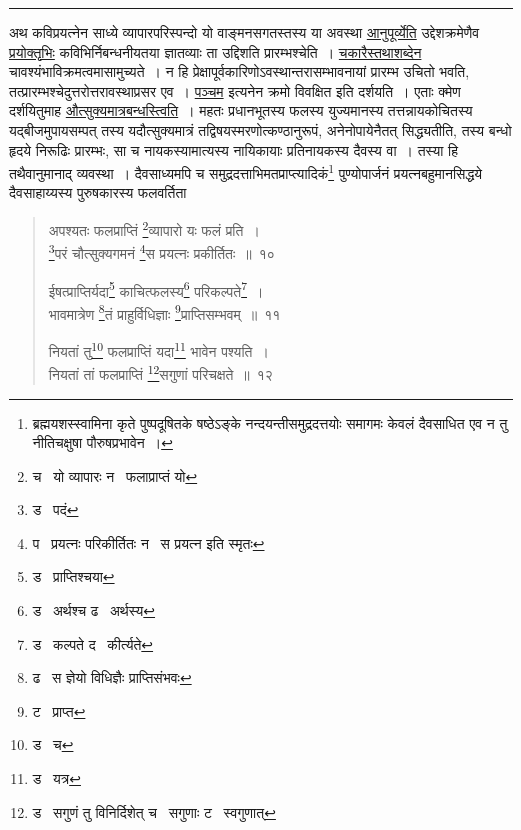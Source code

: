 \documentclass[11pt, openany]{book}
\begin{document}
\hrule

\vspace{2mm}
अथ कविप्रयत्नेन साध्ये व्यापारपरिस्पन्दो यो वाङ्मनसगतस्तस्य या अवस्था \underline{आनुपूर्व्येति} उद्देशक्रमेणैव \underline{प्रयोक्तृभिः} कविभिर्निबन्धनीयतया ज्ञातव्याः ता उद्दिशति प्रारम्भश्चेति~। \underline{चकारैस्तथाशब्देन} चावश्यंभाविक्रमत्वमासामुच्यते~। न हि प्रेक्षापूर्वकारिणोऽवस्थान्तरासम्भावनायां प्रारम्भ उचितो भवति, तत्प्रारम्भश्चेदुत्तरोत्तरावस्थाप्रसर एव~। \underline{पञ्चम} इत्यनेन क्रमो विवक्षित इति दर्शयति~। एताः क्मेण दर्शयितुमाह \underline{औत्सुक्यमात्रबन्धस्त्विति}~। महतः प्रधानभूतस्य फलस्य युज्यमानस्य तत्तन्नायकोचितस्य यद्बीजमुपायसम्पत् तस्य यदौत्सुक्यमात्रं तद्विषयस्मरणोत्कण्ठानुरूपं, अनेनोपायेनैतत् सिद्ध्यतीति, तस्य बन्धो हृदये निरूढिः प्रारम्भः, सा च नायकस्यामात्यस्य नायिकायाः प्रतिनायकस्य दैवस्य वा~। तस्या हि तथैवानुमानाद् व्यवस्था~। दैवसाध्यमपि च समुद्रदत्ताभिमतप्राप्त्यादिकं\renewcommand{\thefootnote}{*}\footnote{ब्रह्मयशस्स्वामिना कृते पुष्पदूषितके षष्ठेऽङ्के नन्दयन्तीसमुद्रदत्तयोः समागमः केवलं दैवसाधित एव न तु नीतिचक्षुषा पौरुषप्रभावेन~।} पुण्योपार्जनं प्रयत्नबहुमानसिद्धये दैवसाहाय्यस्य पुरुषकारस्य फलवर्तिता

\newpage

\begin{quote}
{\na अपश्यतः फलप्राप्तिं \renewcommand{\thefootnote}{1}\footnote{च \textendash\ यो व्यापारः न \textendash\ फलाप्राप्तं यो}व्यापारो यः फलं प्रति~।\\
\renewcommand{\thefootnote}{2}\footnote{ड \textendash\ पदं}परं चौत्सुक्यगमनं \renewcommand{\thefootnote}{3}\footnote{प \textendash\ प्रयत्नः परिकीर्तितः न \textendash\ स प्रयत्न इति स्मृतः}स प्रयत्नः प्रकीर्तितः~॥~१०

ईषत्प्राप्तिर्यदा\renewcommand{\thefootnote}{4}\footnote{ड \textendash\ प्राप्तिश्चया} काचित्फलस्य\renewcommand{\thefootnote}{5}\footnote{ड \textendash\ अर्थश्च ढ \textendash\ अर्थस्य} परिकल्पते\renewcommand{\thefootnote}{6}\footnote{ड \textendash\ कल्पते द \textendash\ कीर्त्यते}~।\\
भावमात्रेण \renewcommand{\thefootnote}{7}\footnote{ढ \textendash\ स ज्ञेयो विधिज्ञैः प्राप्तिसंभवः}तं प्राहुर्विधिज्ञाः \renewcommand{\thefootnote}{8}\footnote{ट \textendash\ प्राप्त}प्राप्तिसम्भवम्~॥~११

नियतां तु\renewcommand{\thefootnote}{9}\footnote{ड \textendash\ च} फलप्राप्तिं यदा\renewcommand{\thefootnote}{10}\footnote{ड \textendash\ यत्र} भावेन पश्यति~।\\
नियतां तां फलप्राप्तिं \renewcommand{\thefootnote}{11}\footnote{ड \textendash\ सगुणं तु विनिर्दिशेत् च \textendash\ सगुणाः ट \textendash\ स्वगुणात्}सगुणां परिचक्षते~॥~१२}
\end{quote}
\end{document}
